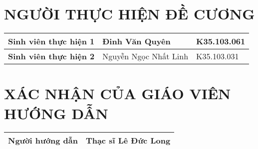 \section*{NGƯỜI THỰC HIỆN ĐỀ CƯƠNG}
\begin{longtable}{|p{4cm}|p{6cm}|p{3cm}|}
\hline
\textbf{Sinh viên thực hiện 1} & Đinh Văn Quyên & K35.103.061 \\ \hline
\textbf{Sinh viên thực hiện 2} & Nguyễn Ngọc Nhất Linh & K35.103.031 \\ \hline
\end{longtable}

\section*{XÁC NHẬN CỦA GIÁO VIÊN HƯỚNG DẪN}
\begin{longtable}{|p{4cm}|p{10cm}|}
\hline
\textbf{Người hướng dẫn} & Thạc sĩ Lê Đức Long \\ \hline
\end{longtable}